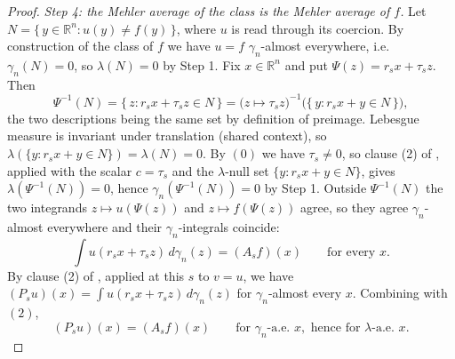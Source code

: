 \begin{proof}
\emph{Step 4: the Mehler average of the class is the Mehler average of $f$.}
Let $N = \{\,y \in \mathbb{R}^n : u(y) \neq f(y)\,\}$, where $u$ is read through
its coercion.  By construction of the class of $f$ we have $u = f$
$\gamma_n$-almost everywhere, i.e.\ $\gamma_n(N) = 0$, so $\lambda(N) = 0$ by
Step 1.  Fix $x \in \mathbb{R}^n$ and put $\Psi(z) = r_sx+\tau_sz$.  Then
\[
  \Psi^{-1}(N)
    = \{\,z : r_sx+\tau_sz \in N\,\}
    = \bigl(z \mapsto \tau_sz\bigr)^{-1}
        \bigl(\{\,y : r_sx+y \in N\,\}\bigr) ,
\]
the two descriptions being the same set by definition of preimage.  Lebesgue
measure is invariant under translation (shared context), so
$\lambda(\{y : r_sx+y \in N\}) = \lambda(N) = 0$.  By $(0)$ we have
$\tau_s \neq 0$, so clause (2) of , applied with the
scalar $c = \tau_s$ and the $\lambda$-null set $\{y : r_sx+y \in N\}$, gives
$\lambda(\Psi^{-1}(N)) = 0$, hence $\gamma_n(\Psi^{-1}(N)) = 0$ by Step 1.
Outside $\Psi^{-1}(N)$ the two integrands $z \mapsto u(\Psi(z))$ and
$z \mapsto f(\Psi(z))$ agree, so they agree $\gamma_n$-almost everywhere and
their $\gamma_n$-integrals coincide:
\begin{equation*}
  \int u(r_sx+\tau_sz)\,d\gamma_n(z) = (A_sf)(x)
  \qquad\text{for every } x . \tag{2}
\end{equation*}
By clause (2) of , applied at this $s$ to $v = u$, we have
$(P_su)(x) = \int u(r_sx+\tau_sz)\,d\gamma_n(z)$ for $\gamma_n$-almost every $x$.
Combining with $(2)$,
\begin{equation*}
  (P_su)(x) = (A_sf)(x)
  \qquad\text{for } \gamma_n\text{-a.e. } x,\text{ hence for }
  \lambda\text{-a.e. } x. \tag{3}
\end{equation*}


\end{proof}
